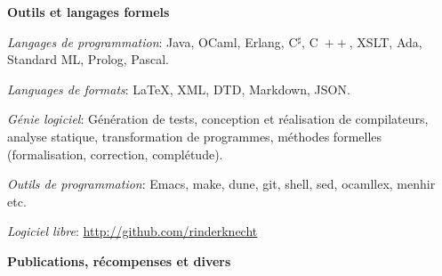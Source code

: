 \documentclass[a4paper,11pt]{article}
\newcommand{\cpp}{\mbox{C \hspace*{-2.5mm} \raise 0.7mm \hbox{${\scriptscriptstyle ++}$}}}
\begin{document}
\noindent\textbf{\large Outils et langages formels}
\medskip
\begin{itemize*}

  \item \textit{Langages de programmation}: Java, OCaml, Erlang,
    C$^\sharp$, \cpp, XSLT, Ada, Standard ML, Prolog, Pascal.

  \item \textit{Languages de formats}: \LaTeX, XML, DTD, Markdown,
    JSON.


  \item \textit{Génie logiciel}: Génération de tests, conception et
    réalisation de compilateurs, analyse statique, transformation de
    programmes, méthodes formelles (formalisation, correction,
    complétude).



  \item \textit{Outils de programmation}: Emacs, make, dune, git,
    shell, sed, ocamllex, menhir etc.

  \item \textit{Logiciel libre}: \url{http://github.com/rinderknecht}


\end{itemize*}

\bigskip
\noindent\textbf{\large Publications, récompenses et divers}
\end{document}

